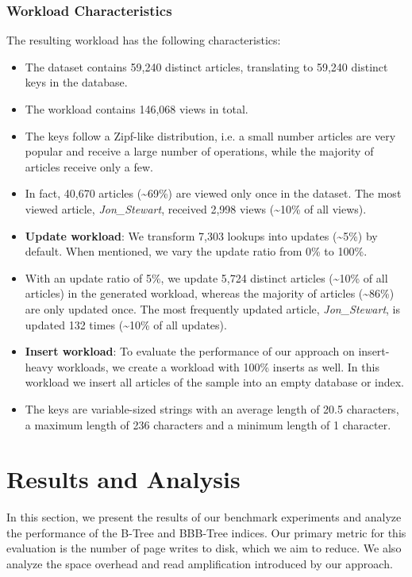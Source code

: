 \subsubsection*{Workload Characteristics}
\label{sec:workload-characteristics}
The resulting workload has the following characteristics:
\begin{itemize}
    \item The dataset contains 59,240 distinct articles, translating to 59,240 distinct keys in the database.
    \item The workload contains 146,068 views in total.
    \item The keys follow a Zipf-like distribution, i.e. a small number articles are very popular and receive a large number of operations, while the majority of articles receive only a few. 
    \item In fact, 40,670 articles (\textasciitilde69\%) are viewed only once in the dataset. 
    The most viewed article, \textit{Jon\_Stewart}, received 2,998 views (\textasciitilde10\% of all views).
    \item \textbf{Update workload}: We transform 7,303 lookups into updates (\textasciitilde5\%) by default. When mentioned, we vary the update ratio from 0\% to 100\%.
    \item With an update ratio of 5\%, we update 5,724 distinct articles (\textasciitilde10\% of all articles) in the generated workload, whereas the majority of articles (\textasciitilde86\%) are only updated once.
    The most frequently updated article, \textit{Jon\_Stewart}, is updated 132 times (\textasciitilde10\% of all updates).
    \item \textbf{Insert workload}: To evaluate the performance of our approach on insert-heavy workloads, we create a workload with 100\% inserts as well.
    In this workload we insert all articles of the sample into an empty database or index.
    \item The keys are variable-sized strings with an average length of 20.5 characters, a maximum length of 236 characters and a minimum length of 1 character.
\end{itemize}

\section{Results and Analysis}
In this section, we present the results of our benchmark experiments and analyze the performance of the B-Tree and BBB-Tree indices.
Our primary metric for this evaluation is the number of page writes to disk, which we aim to reduce.
We also analyze the space overhead and read amplification introduced by our approach.

